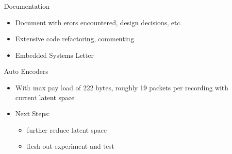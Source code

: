 \begin{frame}{Documentation}
    \begin{itemize}
        \item Document with erors encountered, design decisions, etc.
        \item Extensive code refactoring, commenting
        \item Embedded Systems Letter
    \end{itemize}
\end{frame}

\begin{frame}{Auto Encoders}
    \begin{itemize}
        \item With max pay load of 222 bytes, roughly 19 packets per recording with current latent space
        \item Next Steps:
        \begin{itemize}
            \item further reduce latent space 
            \item flesh out experiment and test
        \end{itemize}
    \end{itemize}
\end{frame}





